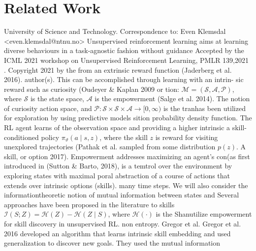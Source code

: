\section{Related Work} University of Science and Technology. Correspondence to: Even Klemsdal <even.klemsdal@ntnu.no> Unsupervised reinforcement learning aims at learning diverse behaviours in a task-agnostic fashion without guidance Accepted by the ICML 2021 workshop on Unsupervised Reinforcement Learning, PMLR 139,2021 . Copyright 2021 by the from an extrinsic reward function (Jaderberg et al. 2016). author(s). This can be accomplished through learning with an intrin- sic reward such as curiosity (Oudeyer \& Kaplan 2009 or tion: $\mathcal{M}=(\mathcal{S}, \mathcal{A}, \mathcal{P})$, where $\mathcal{S}$ is the state space, $\mathcal{A}$ is the empowerment (Salge et al. 2014). The notion of curiosity action space, and $\mathcal{P}: \mathcal{S} \times \mathcal{S} \times \mathcal{A} \rightarrow[0, \infty)$ is the tranhas been utilized for exploration by using predictive models sition probability density function. The RL agent learns of the observation space and providing a higher intrinsic a skill-conditioned policy $\pi_{\vartheta}(a \mid s, z)$, where the skill $z$ is reward for visiting unexplored trajectories (Pathak et al. sampled from some distribution $p(z)$. A skill, or option 2017). Empowerment addresses maximizing an agent's con(as first introduced in (Sutton \& Barto, 2018), is a temtrol over the environment by exploring states with maximal poral abstraction of a course of actions that extends over intrinsic options (skills). many time steps. We will also consider the informationtheoretic notion of mutual information between states and Several approaches have been proposed in the literature to skills $\mathcal{I}(S ; Z)=\mathcal{H}(Z)-\mathcal{H}(Z \mid S)$, where $\mathcal{H}(\cdot)$ is the Shanutilize empowerment for skill discovery in unsupervised RL. non entropy. Gregor et al. Gregor et al. 2016 developed an algorithm that learns intrinsic skill embedding and used generalization to discover new goals. They used the mutual information

